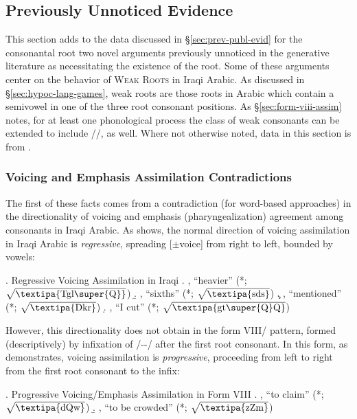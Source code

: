 \documentclass[12pt,twoside,letterpaper]{article}
\begin{document}
\subsection{Previously Unnoticed Evidence}
\label{sec:prev-unnot-evid}

This section adds to the data discussed in \S{\ref{sec:prev-publ-evid}} for the consonantal root two novel arguments previously unnoticed in the generative literature as necessitating the existence of the root. Some of these arguments center on the behavior of \textsc{Weak Roots} in Iraqi Arabic. As discussed in \S{\ref{sec:hypoc-lang-games}}, weak roots are those roots in Arabic which contain a semivowel in one of the three root consonant positions. As \S{\ref{sec:form-viii-assim}} notes, for at least one phonological process the class of weak consonants can be extended to include //, as well. Where not otherwise noted, data in this section is from \cite{erwin04}.

\subsubsection{Voicing and Emphasis Assimilation Contradictions}
\label{sec:voic-emph-assim}

The first of these facts comes from a contradiction (for word-based approaches) in the directionality of voicing and emphasis (pharyngealization) agreement among consonants in Iraqi Arabic. As \Next shows, the normal direction of voicing assimilation in Iraqi Arabic is \emph{regressive}, spreading [$\pm$voice] from right to left, bounded by vowels:

\ex. Regressive Voicing Assimilation in Iraqi \cite[p.36]{erwin04}
\a. , ``heavier'' (*; $\sqrt{\textrm{\textipa{Tgl\super{Q}}}}$)
\b. , ``sixths'' (*; $\sqrt{\textrm{\textipa{sds}}}$)
\c. , ``mentioned'' (*; $\sqrt{\textrm{\textipa{Dkr}}}$)
\d. , ``I cut'' (*; $\sqrt{\textrm{\textipa{gt\super{Q}Q}}}$)

However, this directionality does not obtain in the form VIII/{\em {}} pattern, formed (descriptively) by infixation of /--/ after the first root consonant. In this form, as \Next demonstrates, voicing assimilation is \emph{progressive}, proceeding from left to right from the first root consonant to the infix:

\ex. \label{ex:assimilation-viii} Progressive Voicing/Emphasis Assimilation in Form VIII \citep[p. 74]{erwin04}
\a. \label{ex:emphasis-viii}, ``to claim'' (*; $\sqrt{\textrm{\textipa{dQw}}}$)
\b. , ``to be crowded'' (*; $\sqrt{\textrm{\textipa{zZm}}}$)
\end{document}
